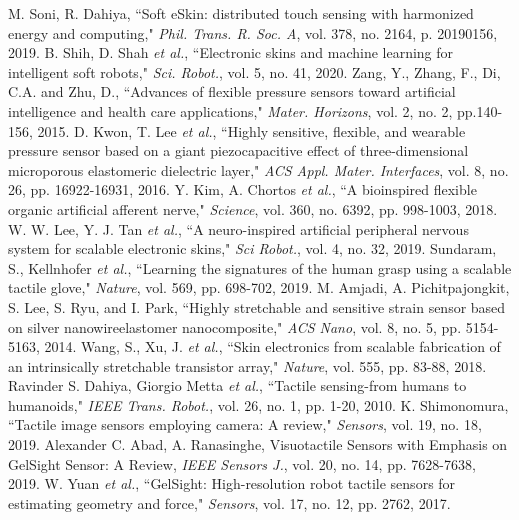 \documentclass[10pt,letterpaper,journal,final,twoside,twocolumn,nofonttune]{IEEEtran}
\begin{document}
\begin{thebibliography}{1}
M. Soni, R. Dahiya, ``Soft eSkin: distributed touch sensing with harmonized energy and computing," \emph{Phil. Trans. R. Soc. A}, vol. 378, no. 2164, p. 20190156, 2019.
B. Shih, D. Shah \emph{et al.}, ``Electronic skins and machine learning for intelligent soft robots," \emph{Sci. Robot.}, vol. 5, no. 41, 2020.%
Zang, Y., Zhang, F., Di, C.A. and Zhu, D., ``Advances of flexible pressure sensors toward artificial intelligence and health care applications," \emph{Mater. Horizons}, vol. 2, no. 2, pp.140-156, 2015.
D. Kwon, T. Lee \emph{et al.}, ``Highly sensitive, flexible, and wearable pressure sensor based on a giant piezocapacitive effect of three-dimensional microporous elastomeric dielectric layer," \emph{ACS Appl. Mater. Interfaces}, vol. 8, no. 26, pp. 16922-16931, 2016.
Y. Kim, A. Chortos \emph{et al.}, ``A bioinspired flexible organic artificial afferent nerve," \emph{Science}, vol. 360, no. 6392, pp. 998-1003, 2018.
W. W. Lee, Y. J. Tan \emph{et al.}, ``A neuro-inspired artificial peripheral nervous system for scalable electronic skins," \emph{Sci Robot.}, vol. 4, no. 32, 2019.%
Sundaram, S., Kellnhofer \emph{et al.}, ``Learning the signatures of the human grasp using a scalable tactile glove," \emph{Nature}, vol. 569, pp. 698-702, 2019.
M. Amjadi, A. Pichitpajongkit, S. Lee, S. Ryu, and I. Park, ``Highly stretchable and sensitive strain sensor based on silver nanowireelastomer nanocomposite," \emph{ACS Nano}, vol. 8, no. 5, pp. 5154-5163, 2014.
Wang, S., Xu, J. \emph{et al.}, ``Skin electronics from scalable fabrication of an intrinsically stretchable transistor array," \emph{Nature}, vol. 555, pp. 83-88, 2018. 
Ravinder S. Dahiya, Giorgio Metta \emph{et al.}, ``Tactile sensing-from humans to humanoids," \emph{IEEE Trans. Robot.}, vol. 26, no. 1, pp. 1-20, 2010.
K. Shimonomura, ``Tactile image sensors employing camera: A review,"
\emph{Sensors}, vol. 19, no. 18, 2019.%
Alexander C. Abad, A. Ranasinghe, Visuotactile Sensors with Emphasis on GelSight Sensor: A Review, \emph{IEEE Sensors J.}, vol. 20, no. 14, pp. 7628-7638, 2019. 
W. Yuan \emph{et al.}, ``GelSight: High-resolution robot tactile sensors for estimating geometry and force," \emph{Sensors}, vol. 17, no. 12, pp. 2762, 2017.

\end{thebibliography}
\end{document}
